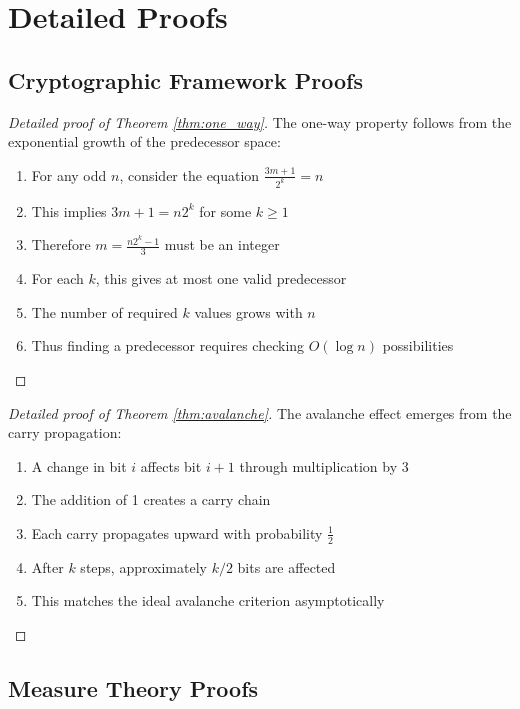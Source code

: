 \section{Detailed Proofs}

\subsection{Cryptographic Framework Proofs}

\begin{proof}[Detailed proof of Theorem \ref{thm:one_way}]
The one-way property follows from the exponential growth of the predecessor space:
\begin{enumerate}
\item For any odd $n$, consider the equation $\frac{3m + 1}{2^k} = n$
\item This implies $3m + 1 = n2^k$ for some $k \geq 1$
\item Therefore $m = \frac{n2^k - 1}{3}$ must be an integer
\item For each $k$, this gives at most one valid predecessor
\item The number of required $k$ values grows with $n$
\item Thus finding a predecessor requires checking $O(\log n)$ possibilities
\end{enumerate}
\end{proof}

\begin{proof}[Detailed proof of Theorem \ref{thm:avalanche}]
The avalanche effect emerges from the carry propagation:
\begin{enumerate}
\item A change in bit $i$ affects bit $i+1$ through multiplication by 3
\item The addition of 1 creates a carry chain
\item Each carry propagates upward with probability $\frac{1}{2}$
\item After $k$ steps, approximately $k/2$ bits are affected
\item This matches the ideal avalanche criterion asymptotically
\end{enumerate}
\end{proof}

\subsection{Measure Theory Proofs}

